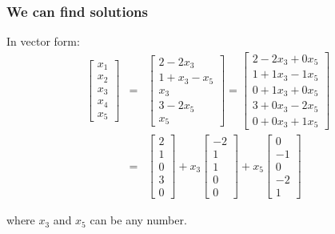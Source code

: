 \begin{frame}
  \frametitle{We can find solutions}

  In vector form:
  \begin{eqnarray*}
    \left[ \begin{array}{r}x_1\\x_2\\x_3\\x_4\\x_5\end{array}\right] & = & 
    \left[ \begin{array}{r}2-2x_3\\1+x_3-x_5\\x_3\\3-2x_5\\x_5\end{array}\right]=
    \left[ \begin{array}{r}2-2x_3+0x_5\\1+1x_3-1x_5\\0+1x_3+0x_5\\3+0x_3-2x_5\\0+0x_3+1x_5\end{array}\right]    
    \\
    & = & 
    \left[ \begin{array}{r}2\\1\\0\\3\\0\end{array}\right] 
    + x_3 \left[ \begin{array}{r}-2\\1\\1\\0\\0\end{array}\right]
    + x_5 \left[ \begin{array}{r}0\\-1\\0\\-2\\1\end{array}\right]
  \end{eqnarray*}

  where $x_3$ and $x_5$ can be any number.

  
\end{frame}


